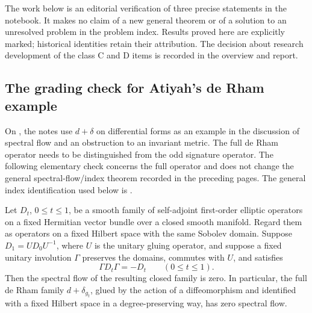 The work below is an editorial verification of three precise statements in the
notebook.  It makes no claim of a new general theorem or of a solution to an
unresolved problem in the problem index.  Results proved here are explicitly
marked; historical identities retain their attribution.  The decision about
research development of the class C and D items is recorded in the overview
and report.

\subsection{The grading check for Atiyah's de Rham example}
\label{verification:grading}

On , the notes use \(d+\delta\) on differential forms as an
example in the discussion of spectral flow and an obstruction to an invariant
metric.  The full de Rham operator needs to be distinguished from the odd
signature operator.  The following elementary check concerns the full operator
and does not change the general spectral-flow/index theorem recorded in the
preceding pages.
The general index identification used below is
\citet[\S7, Theorem 7.4 and pp.94--95]{atiyahpatodisinger1976spectral3}.

\begin{proposition}\ours{}
Let \(D_t\), \(0\leq t\leq1\), be a smooth family of self-adjoint first-order
elliptic operators on a fixed Hermitian vector bundle over a closed smooth
manifold.  Regard them as operators on a fixed Hilbert space with the same
Sobolev domain.  Suppose \(D_1=UD_0U^{-1}\), where \(U\) is the unitary gluing
operator, and suppose a fixed unitary involution \(\Gamma\) preserves the
domains, commutes with \(U\), and satisfies
\[
\Gamma D_t\Gamma=-D_t\qquad(0\leq t\leq1).
\]
Then the spectral flow of the resulting closed family is zero.  In particular,
the full de Rham family \(d+\delta_{g_t}\), glued by the action of a
diffeomorphism and identified with a fixed Hilbert space in a
degree-preserving way, has zero spectral flow.
\end{proposition}

